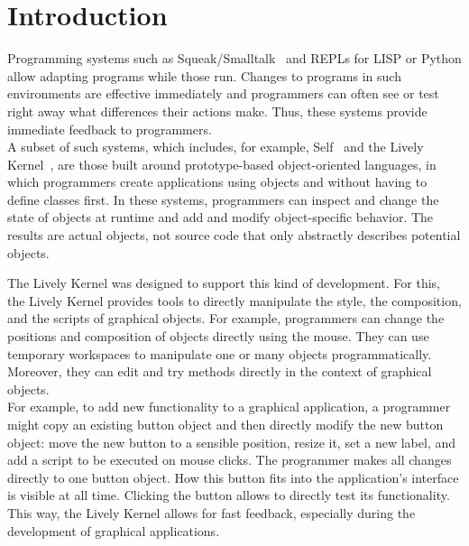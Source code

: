 
\chapter{Introduction} \label{chapter:INTRODUCTION}

Programming systems such as Squeak/Smalltalk~\cite{Ingalls1997Squeak,GoldbergRobson83} and REPLs for LISP or Python allow adapting programs while those run.
Changes to programs in such environments are effective immediately and programmers can often see or test right away what differences their actions make.
Thus, these systems provide immediate feedback to programmers.\\
A subset of such systems, which includes, for example, Self~\cite{Ungar1987SPS,Ungar2007SEL} and the Lively Kernel~\cite{Ingalls2008LKS,Krahn2009LWD}, are those built around prototype-based object-oriented languages, in which programmers create applications using objects and without having to define classes first.
In these systems, programmers can inspect and change the state of objects at runtime and add and modify object-specific behavior.
The results are actual objects, not source code that only abstractly describes potential objects.

The Lively Kernel was designed to support this kind of development.
For this, the Lively Kernel provides tools to directly manipulate the style, the composition, and the scripts of graphical objects.
For example, programmers can change the positions and composition of objects directly using the mouse.
They can use temporary workspaces to manipulate one or many objects programmatically.
Moreover, they can edit and try methods directly in the context of graphical objects.\\
For example, to add new functionality to a graphical application, a programmer might copy an existing button object and then directly modify the new button object: move the new button to a sensible position, resize it, set a new label, and add a script to be executed on mouse clicks.
The programmer makes all changes directly to one button object.
How this button fits into the application's interface is visible at all time.
Clicking the button allows to directly test its functionality.
This way, the Lively Kernel allows for fast feedback, especially during the development of graphical applications.

